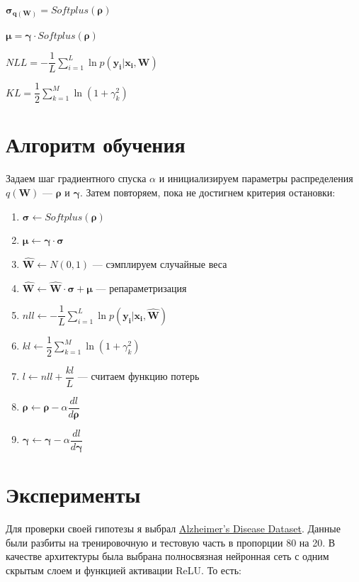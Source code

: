 \documentclass{article}
\begin{document}
$\pmb{\sigma_{q(\mathbf{W})}} = Softplus(\pmb{\rho})$

$\pmb{\mu} = \pmb{\gamma} \cdot Softplus(\pmb{\rho})$

$NLL = -\dfrac{1}{L}\sum_{i=1}^{L}{\ln{p( \mathbf{y_{i}} | \mathbf{x_{i}}, \mathbf{W})}}$

$KL = \dfrac{1}{2}\sum_{k=1}^{M}\ln({1 + \gamma_{k}^{2}})$

\section{Алгоритм обучения}
Задаем шаг градиентного спуска $\alpha$ и инициализируем параметры распределения $q(\mathbf{W})$ — $\pmb{\rho}$ и $\pmb{\gamma}$. Затем повторяем, пока не достигнем критерия остановки:
\begin{enumerate}
    \item $\pmb{\sigma} \leftarrow Softplus(\pmb{\rho})$
    \item $\pmb{\mu} \leftarrow \pmb{\gamma} \cdot \pmb{\sigma}$
    \item $\hat{\mathbf{W}} \leftarrow N(0, 1)$ — сэмплируем случайные веса
    \item $\hat{\mathbf{W}} \leftarrow \hat{\mathbf{W}} \cdot \pmb{\sigma} + \pmb{\mu}$ — репараметризация
    \item $nll \leftarrow -\dfrac{1}{L}\sum_{i=1}^{L}{\ln{p( \mathbf{y_{i}} | \mathbf{x_{i}}, \mathbf{\hat{W}})}}$
    \item $kl \leftarrow \dfrac{1}{2}\sum_{k=1}^{M}\ln({1 + \gamma_{k}^{2}})$
    \item $l \leftarrow nll + \dfrac{kl}{L}$ — считаем функцию потерь
    \item $\pmb{\rho} \leftarrow \pmb{\rho} - \alpha \dfrac{d l}{d \pmb{\rho}}$
    \item $\pmb{\gamma} \leftarrow \pmb{\gamma} - \alpha \dfrac{d l}{d \pmb{\gamma}}$
\end{enumerate}

\section{Эксперименты}

Для проверки своей гипотезы я выбрал \href{https://www.kaggle.com/datasets/rabieelkharoua/alzheimers-disease-dataset}{Alzheimer's Disease Dataset}. Данные были разбиты на тренировочную и тестовую часть в пропорции 80 на 20. В качестве архитектуры была выбрана полносвязная нейронная сеть с одним скрытым слоем и функцией активации ReLU. То есть:
\end{document}
